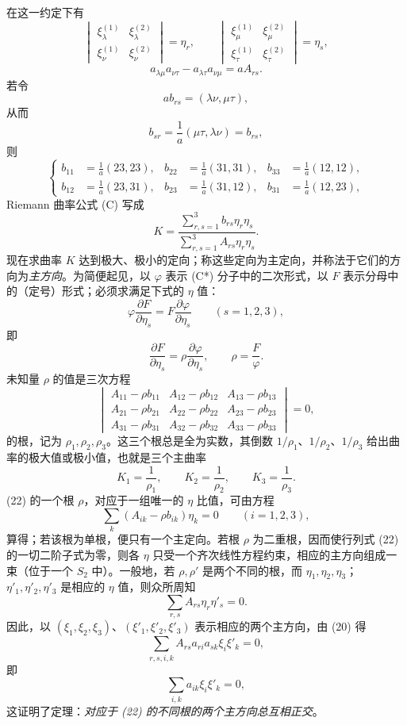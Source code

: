 在这一约定下有
\[
 \begin{vmatrix}\xi_\lambda^{(1)}&\xi_\lambda^{(2)}\\\xi_\nu^{(1)}&\xi_\nu^{(2)}\end{vmatrix}=\eta_r,
 \qquad
 \begin{vmatrix}\xi_\mu^{(1)}&\xi_\mu^{(2)}\\\xi_\tau^{(1)}&\xi_\tau^{(2)}\end{vmatrix}=\eta_s,
\]
\[
 a_{\lambda\mu}a_{\nu\tau}-a_{\lambda\tau}a_{\nu\mu}=aA_{rs}.
\]
若令
\[
 ab_{rs}=(\lambda\nu,
\mu\tau),
\]
从而
\[
 b_{sr}=\frac1a(\mu\tau,
\lambda\nu)=b_{rs},
\]
则
\begin{equation}\tag{21}
\left\{
\begin{aligned}
 b_{11}&=\frac1a(23,23),& b_{22}&=\frac1a(31,31),& b_{33}&=\frac1a(12,12),\\
 b_{12}&=\frac1a(23,31),& b_{23}&=\frac1a(31,12),& b_{31}&=\frac1a(12,23),
\end{aligned}
\right.
\end{equation}
Riemann 曲率公式 (C) 写成
\begin{equation}\tag{C*}
 K=\frac{\sum_{r,s=1}^{3}b_{rs}\eta_r\eta_s}{\sum_{r,s=1}^{3}A_{rs}\eta_r\eta_s}.
\end{equation}
现在求曲率 \(K\) 达到极大、极小的定向；称这些定向为主定向，并称法于它们的方向为\emph{主方向}。为简便起见，以 \(\varphi\) 表示 (C*) 分子中的二次形式，以 \(F\) 表示分母中的（定号）形式；必须求满足下式的 \(\eta\) 值：
\[
 \varphi\frac{\partial F}{\partial\eta_s}=F\frac{\partial\varphi}{\partial\eta_s}
 \qquad(s=1,2,3),
\]
即
\[
 \frac{\partial F}{\partial\eta_s}=\rho\frac{\partial\varphi}{\partial\eta_s},
 \qquad \rho=\frac{F}{\varphi}.
\]
未知量 \(\rho\) 的值是三次方程
\begin{equation}\tag{22}
\begin{vmatrix}
A_{11}-\rho b_{11}&A_{12}-\rho b_{12}&A_{13}-\rho b_{13}\\
A_{21}-\rho b_{21}&A_{22}-\rho b_{22}&A_{23}-\rho b_{23}\\
A_{31}-\rho b_{31}&A_{32}-\rho b_{32}&A_{33}-\rho b_{33}
\end{vmatrix}=0,
\end{equation}
的根，记为 \(\rho_1,\rho_2,\rho_3\)。这三个根总是全为实数，其倒数 \(1/\rho_1\)、\(1/\rho_2\)、\(1/\rho_3\) 给出曲率的极大值或极小值，也就是三个主曲率
\[
 K_1=\frac1{\rho_1},
\qquad
 K_2=\frac1{\rho_2},
\qquad
 K_3=\frac1{\rho_3}.
\]
(22) 的一个根 \(\rho\)，对应于一组唯一的 \(\eta\) 比值，可由方程
\begin{equation}\tag{22*}
 \sum_{k}(A_{ik}-\rho b_{ik})\eta_k=0\qquad(i=1,2,3),
\end{equation}
算得；若该根为单根，便只有一个主定向。若根 \(\rho\) 为二重根，因而使行列式 (22) 的一切二阶子式为零，则各 \(\eta\) 只受一个齐次线性方程约束，相应的主方向组成一束（位于一个 \(S_2\) 中）。一般地，若 \(\rho,\rho'\) 是两个不同的根，而 \(\eta_1,\eta_2,\eta_3\)；\(\eta'_1,\eta'_2,\eta'_3\) 是相应的 \(\eta\) 值，则众所周知
\[
 \sum_{r,s}A_{rs}\eta_r\eta'_s=0.
\]
因此，以 \((\xi_1,\xi_2,\xi_3)\)、\((\xi'_1,\xi'_2,\xi'_3)\) 表示相应的两个主方向，由 (20) 得
\[
 \sum_{r,s,i,k}A_{rs}a_{ri}a_{sk}\xi_i\xi'_k=0,
\]
即
\[
 \sum_{i,k}a_{ik}\xi_i\xi'_k=0,
\]
这证明了定理：\emph{对应于 (22) 的不同根的两个主方向总互相正交}。


